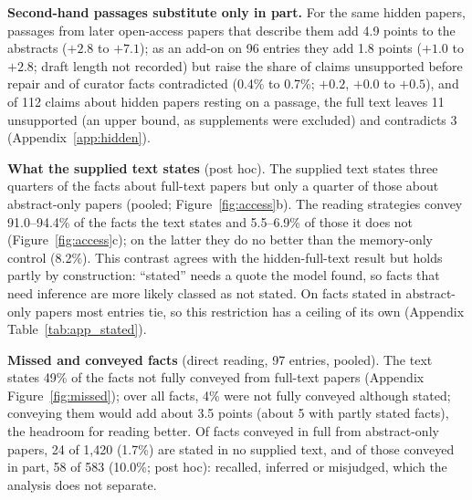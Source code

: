\documentclass{article} %
\begin{document}
\textbf{Second-hand passages substitute only in part.} For the same hidden papers, passages from later open-access papers that describe them add 4.9 points to the abstracts ($+2.8$ to $+7.1$); as an add-on on 96 entries they add 1.8 points ($+1.0$ to $+2.8$; draft length not recorded) but raise the share of claims unsupported before repair and of curator facts contradicted (0.4\% to 0.7\%; $+0.2$, $+0.0$ to $+0.5$), and of 112 claims about hidden papers resting on a passage, the full text leaves 11 unsupported (an upper bound, as supplements were excluded) and contradicts 3 (Appendix~\ref{app:hidden}).

\textbf{What the supplied text states} (post hoc). The supplied text states three quarters of the facts about full-text papers but only a quarter of those about abstract-only papers (pooled; Figure~\ref{fig:access}b). The reading strategies convey 91.0--94.4\% of the facts the text states and 5.5--6.9\% of those it does not (Figure~\ref{fig:access}c); on the latter they do no better than the memory-only control (8.2\%). This contrast agrees with the hidden-full-text result but holds partly by construction: ``stated'' needs a quote the model found, so facts that need inference are more likely classed as not stated. On facts stated in abstract-only papers most entries tie, so this restriction has a ceiling of its own (Appendix Table~\ref{tab:app_stated}).

\textbf{Missed and conveyed facts} (direct reading, 97 entries, pooled). The text states 49\% of the facts not fully conveyed from full-text papers (Appendix Figure~\ref{fig:missed}); over all facts, 4\% were not fully conveyed although stated; conveying them would add about 3.5 points (about 5 with partly stated facts), the headroom for reading better. Of facts conveyed in full from abstract-only papers, 24 of 1,420 (1.7\%) are stated in no supplied text, and of those conveyed in part, 58 of 583 (10.0\%; post hoc): recalled, inferred or misjudged, which the analysis does not separate.
\end{document}
